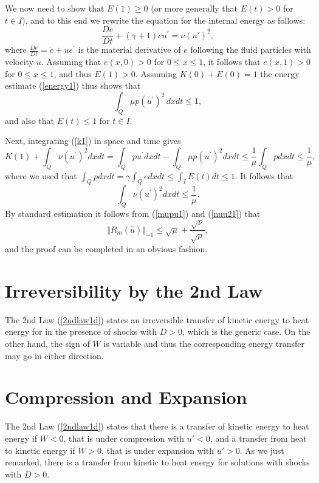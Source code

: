 We now need to show that $E(1)\ge 0$ (or more generally that $E(t)>0$
for $t\in I$), and to this end we
rewrite the equation for the internal energy as follows:
\[
\frac{De}{Dt} +(\gamma +1) eu^\prime =  \nu (u')^2,
\]
where $\frac{De}{Dt}=\dot e+ue^\prime$ is the material derivative
of $e$ following the fluid particles with velocity $u$.
 Assuming that $e(x,0)> 0$ for
$0\le x\le 1$, it follows
that $e(x,1)>0$ for $0\le x\le 1$, and thus $E(1)>0$.
Assuming $K(0)+E(0)=1$ the energy estimate 
(\ref{energy1}) thus shows that
\begin{equation}\label{mupu1}
\int_Q\mu p(u^\prime )^2\, dxdt \le 1,
\end{equation}
and also that $E(t)\le 1$ for $t\in I$.

Next, integrating (\ref{k1}) in space and time gives
\[
K(1)+\int_Q\nu (u^\prime )^2dxdt=\int_Q pu^\prime dxdt -
\int_Q\mu p(u^\prime )^2dxdt \le \frac{1}{\mu}\int_Qpdxdt\le \frac{1}{\mu},
\]
where we used that $\int_Q p dxdt=\gamma \int_Qedxdt \le \int_IE(t)dt\le 1$. It follows that
\begin{equation}\label{nuu21}
\int_Q\nu (u^\prime )^2dxdt\le \frac{1}{\mu}.
\end{equation}
By standard estimation it follows from (\ref{mupu1}) and (\ref{nuu21}) that
\[
\Vert R_m(\hat u)\Vert_{-1}\le \sqrt{\mu}+\frac{\sqrt{\nu}}{\sqrt{\mu}},
\]
and the proof can be completed in an obvious fashion.

\section{Irreversibility by the 2nd Law}

The 2nd Law (\ref{2ndlaw1d}) 
states an irreversible
transfer of kinetic energy to heat energy for in the presence of shocks 
with $D >0$, which is the generic case. 
On the other hand, the sign of $W$ is variable and
thus the corresponding energy transfer may go in either direction. 



\section{Compression and Expansion}

The 2nd Law (\ref{2ndlaw1d}) states that there is a transfer
of kinetic energy to heat energy if $W<0$, that is under compression
with $u'<0$, and a transfer from heat to kinetic energy 
if $W>0$, that is under expansion with $u'>0$. As we just remarked, 
there is a transfer from kinetic to heat energy for solutions
with shocks with $D > 0$. 


